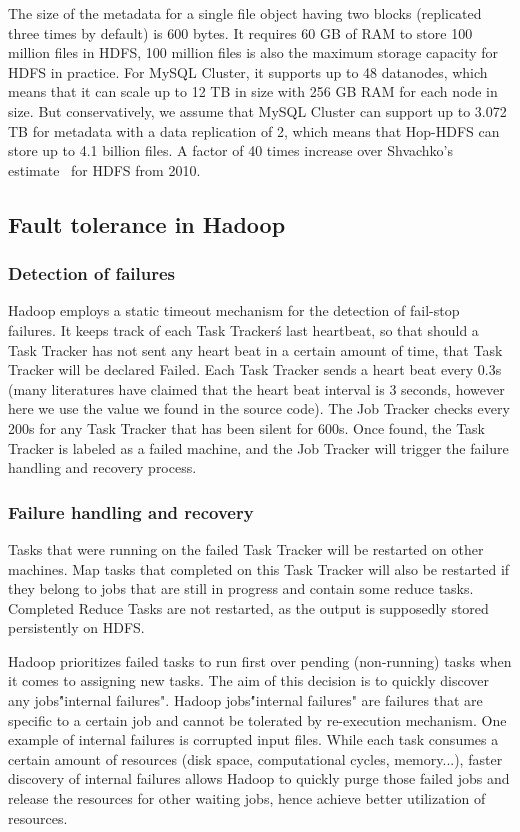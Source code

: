 \documentclass[runningheads,a4paper]{llncs}
\begin{document}
The size of the metadata for a single file object having two blocks (replicated three times by default) is 600 bytes. It requires 60 GB of RAM to store 100 million files in HDFS, 100 million files is also the maximum storage capacity for HDFS in practice. For MySQL Cluster, it supports up to 48 datanodes, which means that it can scale up to 12 TB in size with 256 GB RAM for each node in size. But conservatively, we assume that MySQL Cluster can support up to 3.072 TB for metadata with a data replication of 2, which means that Hop-HDFS can store up to 4.1 billion files. A factor of 40 times increase over Shvachko's estimate~\cite{shvachko2010hdfs} for HDFS from 2010.

\subsection{Fault tolerance in Hadoop}
\subsubsection{Detection of failures}
Hadoop employs a static timeout mechanism for the detection of fail-stop failures. It keeps track of each Task Tracker\'s last heartbeat, so that should a Task Tracker has not sent any heart beat in a certain amount of time, that Task Tracker will be declared Failed.  Each Task Tracker sends a heart beat every 0.3s (many literatures have claimed that the heart beat interval is 3 seconds, however here we use the value we found in the source code).  The Job Tracker checks every 200s for any Task Tracker that has been silent for 600s. Once found, the Task Tracker is labeled as a failed machine, and the Job Tracker will trigger the failure handling and recovery process.
\subsubsection{Failure handling and recovery}
Tasks that were running on the failed Task Tracker will be restarted on other machines. Map tasks that completed on this Task Tracker will also be restarted if they belong to jobs that are still in progress and contain some reduce tasks. Completed Reduce Tasks are not restarted, as the output is supposedly stored persistently on HDFS.

Hadoop prioritizes failed tasks to run first over pending (non-running) tasks when it comes to assigning new tasks. The aim of this decision is to quickly discover any jobs\' "internal failures". Hadoop jobs\' "internal failures" are failures that are specific to a certain job and cannot be tolerated by re-execution mechanism. One example of internal failures is corrupted input files. While each task consumes a certain amount of resources (disk space, computational cycles, memory...), faster discovery of internal failures allows Hadoop to quickly purge those failed jobs and release the resources for other waiting jobs, hence achieve better utilization of resources.
\end{document}
